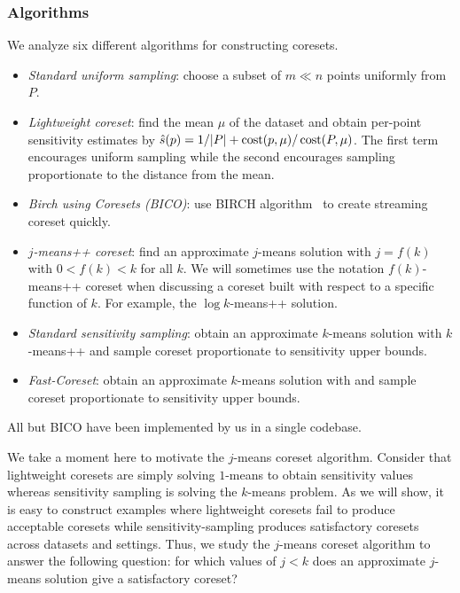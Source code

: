 

\subsubsection{Algorithms}

We analyze six different algorithms for constructing coresets.
\begin{itemize}
        \item \emph{Standard uniform sampling}: choose a subset of $m \ll n$ points uniformly from $P$.
        \item \emph{Lightweight coreset}: find the mean $\mu$ of the dataset and obtain per-point sensitivity estimates by $\hat{s}(p) = 1/|P| + \operatorname{cost}(p, \mu) / \operatorname{cost}(P, \mu)$.
            The first term encourages uniform sampling while the second encourages sampling proportionate to the distance from the mean.
        \item \emph{Birch using Coresets (BICO)}: use BIRCH algorithm~\cite{birch} to create streaming coreset quickly.
        \item \emph{$j$-means++ coreset}: find an approximate $j$-means solution with $j = f(k)$ with $0 < f(k) < k$ for all $k$. We will sometimes use the notation
            $f(k)$-means++ coreset when discussing a coreset built with respect to a specific function of $k$. For example, the $\log k$-means++ solution.
        \item \emph{Standard sensitivity sampling}: obtain an approximate $k$-means solution with $k$-means++ and sample coreset proportionate to sensitivity upper bounds.
        \item \emph{Fast-Coreset}: obtain an approximate $k$-means solution with \fkmeans and sample coreset proportionate to sensitivity upper bounds.
\end{itemize}
All but BICO have been implemented by us in a single codebase.

We take a moment here to motivate the $j$-means coreset algorithm.  Consider that lightweight coresets are simply solving $1$-means to obtain sensitivity values
whereas sensitivity sampling is solving the $k$-means problem.  As we will show, it is easy to construct examples where lightweight coresets fail to produce
acceptable coresets while sensitivity-sampling produces satisfactory coresets across datasets and settings. Thus, we study the $j$-means coreset
algorithm to answer the following question: for which values of $j < k$ does an approximate $j$-means solution give a satisfactory coreset?

